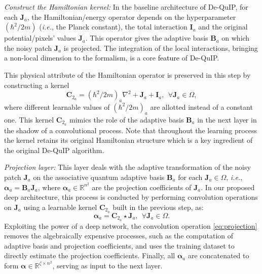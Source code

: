 \documentclass[10pt,journal,compsoc]{IEEEtran}
\newcommand{\sd}{\textcolor{black}}
\newcommand{\dk}{\textcolor{black}}
\def\bsI{{\boldsymbol{I}}}
\def\bsJ{{\boldsymbol{J}}}
\def\bsB{{\boldsymbol{B}}}
\def\bsC{{\boldsymbol{C}}}
\def\balpha{{\boldsymbol{\alpha}}}
\begin{document}
\textit{Construct the Hamiltonian kernel:}
In the baseline architecture \dk{of} De-QuIP, for each $\bsJ_a$, the Hamiltonian/energy operator depends on the hyperparameter $(\hbar ^2/2m)$ (\textit{i.e.}, the Planck constant), the total interaction $\bsI_a$ and the original potential/pixels' values $\bsJ_a$. This operator gives the adaptive basis $\bsB_a$ on which the noisy patch $\bsJ_a$ is projected. The integration of the local interactions, bringing a non-local dimension to the formalism, is a core \sd{feature} of De-QuIP.

This physical attribute of the Hamiltonian operator is preserved in this step by constructing a kernel
\begin{equation}
\bsC_{2_a} = (\hbar ^2/2m)_a \nabla^2 + \bsJ_a + \bsI_a, ~~\forall \bsJ_a \in \Omega,
\label{eq:hamilt_ker}
\end{equation}
where different learnable values of $(\hbar ^2/2m)_a$ are allotted instead of a constant one. This kernel $\bsC_{2_a}$ mimics the role of the adaptive basis $\bsB_a$ in the next layer in the shadow of a convolutional process. Note that throughout the learning process the kernel retains its original Hamiltonian structure which is a key ingredient of the original De-QuIP algorithm.






\textit{Projection layer:}
This layer deals with the adaptive transformation of the noisy patch $\bsJ_a$ on the associative quantum adaptive basis $\bsB_a$ for each $\bsJ_a \in \Omega$, \textit{i.e.}, $\balpha_a = \bsB_a \bsJ_a$, where $\balpha_a \in \mathbb{R}^{n^2}$ are the projection coefficients of $\bsJ_a$. In our proposed deep architecture, this process is conducted by performing convolution operations on $\bsJ_a$ using a learnable kernel $\bsC_{2_a}$ built in the previous step, as:
\begin{equation}
\balpha_a = \bsC_{2_a} \star \bsJ_a, ~~\forall \bsJ_a \in \Omega.
\label{eq:projection}
\end{equation}
Exploiting the power of a deep network, the convolution operation \eqref{eq:projection} removes the algebraically expensive processes, such as the computation of adaptive basis and projection coefficients, and uses the training dataset to directly estimate the projection coefficients. Finally, all $\balpha_a$ are concatenated to form $\balpha \in \mathbb{R}^{\zeta \times n^2}$, serving as input to the next layer.
\end{document}

